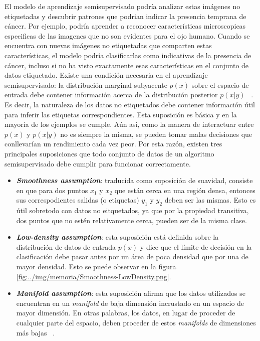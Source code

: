 El modelo de aprendizaje semisupervisado podría analizar estas imágenes no etiquetadas y descubrir patrones que podrian indicar la presencia temprana de cáncer. Por ejemplo, podría aprender a reconocer características microscopicas especificas de las imagenes que no son evidentes para el ojo humano. Cuando se encuentra con nuevas imágenes no etiquetadas que comparten estas características, el modelo podría clasificarlas como indicativas de la presencia de cáncer, incluso si no ha visto exactamente esas características en el conjunto de datos etiquetado.
Existe una condición necesaria en el aprendizaje semisupervisado: la distribución marginal subyacente $p(x)$ sobre el espacio de entrada debe contener información acerca de la distribución posterior $p(x|y)$ ~\cite{Engelen:semi-supervised}. Es decir, la naturaleza de los datos no etiquetados debe contener información útil para inferir las etiquetas correspondientes.
Esta suposición es básica y en la mayoría de los ejemplos se cumple. Aún asi, como la manera de interactuar entre $p(x)$ y  $p(x|y)$ no es siempre la misma, se pueden tomar malas decisiones que conllevarían un rendimiento cada vez peor. Por esta razón, existen tres principales suposiciones que todo conjunto de datos de un algoritmo semisupervisado debe cumplir para funcionar correctamente.
\begin{itemize}
	\item \textit{\textbf{Smoothness assumption}}: traducida como suposición de suavidad, consiste en que para dos puntos $x_{1}$ y $x_{2}$ que están cerca en una región densa, entonces sus correspodientes salidas (o etiquetas) $y_{1}$ y $y_{2}$ deben ser las mismas. Esto es útil sobretodo con datos no eitquetados, ya que por la propiedad transitiva, dos puntos que no estén relativamente cerca, pueden ser de la misma clase.
	\item \textit{\textbf{Low-density assumption}}: esta suposición está definida sobre la distribución de datos de entrada $p(x)$ y dice que el límite de decisión en la clasificación debe pasar antes por un área de poca densidad que por una de mayor densidad. Esto se puede observar en la figura \ref{fig:../img/memoria/Smoothness-LowDensity.png}.

	
	\item \textit{\textbf{Manifold assumption}}: esta suposición afirma que los datos utilizados se encuentran en un \textit{manifold} de baja dimensión incrustado en un espacio de mayor dimensión. En otras palabras, los datos, en lugar de proceder de cualquier parte del espacio, deben proceder de estos \textit{manifolds} de dimensiones más bajas ~\cite{web:assumptions}.
\end{itemize}


